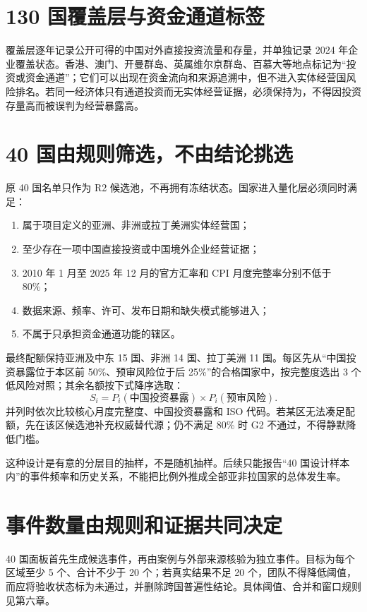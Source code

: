 \documentclass[UTF8,12pt,openany]{ctexbook}
\begin{document}
\section{130 国覆盖层与资金通道标签}
覆盖层逐年记录公开可得的中国对外直接投资流量和存量，并单独记录 2024 年企业覆盖状态。香港、澳门、开曼群岛、英属维尔京群岛、百慕大等地点标记为“投资或资金通道”；它们可以出现在资金流向和来源追溯中，但不进入实体经营国风险排名。若同一经济体只有通道投资而无实体经营证据，必须保持为，不得因投资存量高而被误判为经营暴露高。

\section{40 国由规则筛选，不由结论挑选}
原 40 国名单只作为 R2 候选池，不再拥有冻结状态。国家进入量化层必须同时满足：

\begin{enumerate}
  \item 属于项目定义的亚洲、非洲或拉丁美洲实体经营国；
  \item 至少存在一项中国直接投资或中国境外企业经营证据；
  \item 2010 年 1 月至 2025 年 12 月的官方汇率和 CPI 月度完整率分别不低于 80\%；
  \item 数据来源、频率、许可、发布日期和缺失模式能够进入；
  \item 不属于只承担资金通道功能的辖区。
\end{enumerate}

最终配额保持亚洲及中东 15 国、非洲 14 国、拉丁美洲 11 国。每区先从“中国投资暴露位于本区前 50\%、预审风险位于后 25\%”的合格国家中，按完整度选出 3 个低风险对照；其余名额按下式降序选取：
\[
S_i=P_i(\text{中国投资暴露})\times P_i(\text{预审风险}).
\]
并列时依次比较核心月度完整度、中国投资暴露和 ISO 代码。若某区无法凑足配额，先在该区候选池补充权威替代源；仍不满足 80\% 时 G2 不通过，不得静默降低门槛。

这种设计是有意的分层目的抽样，不是随机抽样。后续只能报告“40 国设计样本内”的事件频率和历史关系，不能把比例外推成全部亚非拉国家的总体发生率。

\section{事件数量由规则和证据共同决定}
40 国面板首先生成候选事件，再由案例与外部来源核验为独立事件。目标为每个区域至少 5 个、合计不少于 20 个；若真实结果不足 20 个，团队不得降低阈值，而应将验收状态标为未通过，并删除跨国普遍性结论。具体阈值、合并和窗口规则见第六章。
\end{document}
